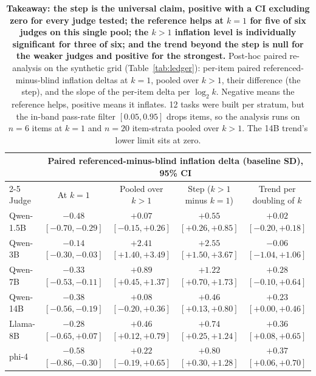 \documentclass[11pt]{article}
\begin{document}
\begin{table}[tbp]
\centering
\small
\setlength{\tabcolsep}{4pt}
\begin{tabular}{lcccc}
\toprule
& \multicolumn{4}{c}{Paired referenced-minus-blind inflation delta (baseline SD), 95\% CI} \\
\cmidrule(lr){2-5}
Judge & At $k{=}1$ & Pooled over $k{>}1$ & Step ($k{>}1$ minus $k{=}1$) & Trend per doubling of $k$ \\
\midrule
Qwen-1.5B & $-0.48$ {\scriptsize$[-0.70,-0.29]$} & $+0.07$ {\scriptsize$[-0.15,+0.26]$} & $+0.55$ {\scriptsize$[+0.26,+0.85]$} & $+0.02$ {\scriptsize$[-0.20,+0.18]$} \\
Qwen-3B   & $-0.14$ {\scriptsize$[-0.30,-0.03]$} & $+2.41$ {\scriptsize$[+1.40,+3.49]$} & $+2.55$ {\scriptsize$[+1.50,+3.67]$} & $-0.06$ {\scriptsize$[-1.04,+1.06]$} \\
Qwen-7B   & $-0.33$ {\scriptsize$[-0.53,-0.11]$} & $+0.89$ {\scriptsize$[+0.45,+1.37]$} & $+1.22$ {\scriptsize$[+0.70,+1.73]$} & $+0.28$ {\scriptsize$[-0.10,+0.64]$} \\
Qwen-14B  & $-0.38$ {\scriptsize$[-0.56,-0.19]$} & $+0.08$ {\scriptsize$[-0.20,+0.36]$} & $+0.46$ {\scriptsize$[+0.13,+0.80]$} & $+0.23$ {\scriptsize$[+0.00,+0.46]$} \\
Llama-8B  & $-0.28$ {\scriptsize$[-0.65,+0.07]$} & $+0.46$ {\scriptsize$[+0.12,+0.79]$} & $+0.74$ {\scriptsize$[+0.25,+1.24]$} & $+0.36$ {\scriptsize$[+0.08,+0.65]$} \\
phi-4     & $-0.58$ {\scriptsize$[-0.86,-0.30]$} & $+0.22$ {\scriptsize$[-0.19,+0.65]$} & $+0.80$ {\scriptsize$[+0.30,+1.28]$} & $+0.37$ {\scriptsize$[+0.06,+0.70]$} \\
\bottomrule
\end{tabular}
\caption{\textbf{Takeaway: the step is the universal claim, positive with a CI excluding zero for every judge tested; the reference helps at $k{=}1$ for five of six judges on this single pool; the $k{>}1$ inflation level is individually significant for three of six; and the trend beyond the step is null for the weaker judges and positive for the strongest.}
Post-hoc paired re-analysis on the synthetic grid (Table~\ref{tab:ledger}): per-item paired referenced-minus-blind inflation deltas at $k{=}1$, pooled over $k > 1$, their difference (the step), and the slope of the per-item delta per $\log_2 k$.
Negative means the reference helps, positive means it inflates.
12 tasks were built per stratum, but the in-band pass-rate filter $[0.05, 0.95]$ drops items, so the analysis runs on $n{=}6$ items at $k{=}1$ and $n{=}20$ item-strata pooled over $k > 1$.
The 14B trend's lower limit sits at zero.}
\label{tab:paired}
\end{table}
\end{document}
